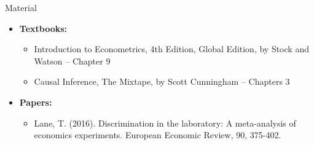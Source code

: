 \documentclass[notes,10pt, aspectratio=169]{beamer}
\begin{document}
\begin{frame}[allowframebreaks]{Material}
\begin{itemize}
    \item[--] \textbf{Textbooks:}
    \begin{itemize}
        \item Introduction to Econometrics, 4th Edition, Global Edition, by Stock and Watson -- Chapter 9
        \item Causal Inference, The Mixtape, by Scott Cunningham -- Chapters 3
    \end{itemize}
    \item[--] \textbf{Papers:}
    \begin{itemize}
        \item Lane, T. (2016). Discrimination in the laboratory: A meta-analysis of economics experiments. European Economic Review, 90, 375-402.
    \end{itemize}
\end{itemize}
\scriptsize{

 
}
\end{frame}
\end{document}
